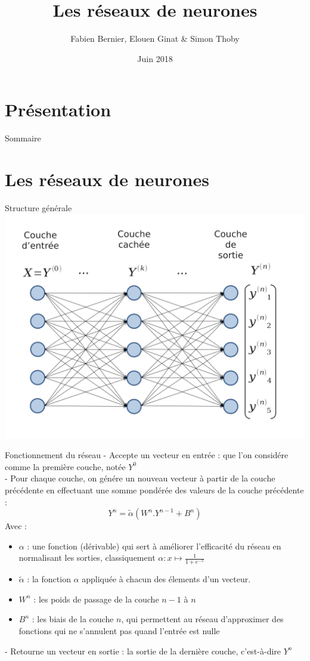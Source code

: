 \documentclass[ignorenonframetext,]{beamer}
\title{Les réseaux de neurones}
\author{Fabien Bernier, Elouen Ginat \& Simon Thoby}
\date{Juin 2018}
\begin{document}
\section*{Présentation}
\frame{\titlepage}

\begin{frame}{Sommaire}
\tableofcontents
\end{frame}

\section{Les réseaux de neurones}
\frame{\sectionpage}
\begin{frame}{Structure générale}
	\includegraphics{net-without-train.png}
\end{frame}

\begin{frame}{Fonctionnement du réseau}
    - Accepte un vecteur en entrée : que l'on considére comme la première couche, notée $ Y^0 $ \\
    - Pour chaque couche, on génére un nouveau vecteur à partir de la couche précédente en effectuant une somme pondérée des valeurs de la couche précédente : \[ Y^n = \tilde\alpha(W^n . Y^{n-1} + B^n) \]
        Avec :
    \begin{itemize}
        \item $ \alpha $ : une fonction (dérivable) qui sert à améliorer l'efficacité du réseau en normalisant les sorties, classiquement $ \alpha : x \mapsto \frac{1}{1+e^{-x}} $
        \item $\tilde\alpha$ : la fonction $\alpha$ appliquée à chacun des élements d'un vecteur.
        \item $ W^n $ : les poids de passage de la couche $ n-1 $ à $ n $
        \item $ B^n $ : les biais de la couche $ n $, qui permettent au réseau d'approximer des fonctions qui ne s'annulent pas quand l'entrée est nulle
    \end{itemize}
    - Retourne un vecteur en sortie : la sortie de la dernière couche, c'est-à-dire $ Y^n $
\end{frame}
\end{document}
